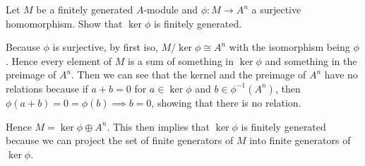 \documentclass[a4paper]{exam}
\newif\ifhint
\begin{document}
\begin{questions}

	\question Let $M$ be a finitely generated $A$-module and $\phi :M\to A^n$ a surjective homomorphism. Show that $\ker \phi$ is finitely generated.
	\ifhint
		Let $e_{1}, \ldots , e_n$ be a basis of $A^n$ and choose $u_i \in M$ such that $\phi (u_i) = e_i (1\le i\le n)$. Show that $M$ is the direct sum of $\ker \phi$ and the submodule generated by $u_1, \ldots , u_n$.
	\fi
	\begin{solution}
		Because $\phi  $ is surjective, by first iso, $M / \ker \phi \cong A^n $ with the isomorphism being $\phi $.
		Hence every element of $M $ is a sum of something in $\ker \phi $ and something in the preimage of $A^n $.
		Then we can see that the kernel and the preimage of $A^n $ have no relations because if $a + b = 0 $ for $a\in \ker \phi $ and $b\in \phi ^{-1}(A^n) $, then $\phi (a+b) = 0 = \phi (b) \implies b = 0 $, showing that there is no relation.

		Hence $M = \ker \phi \oplus A^n $.
		This then implies that $\ker \phi$ is finitely generated because we can project the set of finite generators of $M $ into finite generators of $\ker \phi$.
	\end{solution}


\end{questions}
\end{document}
